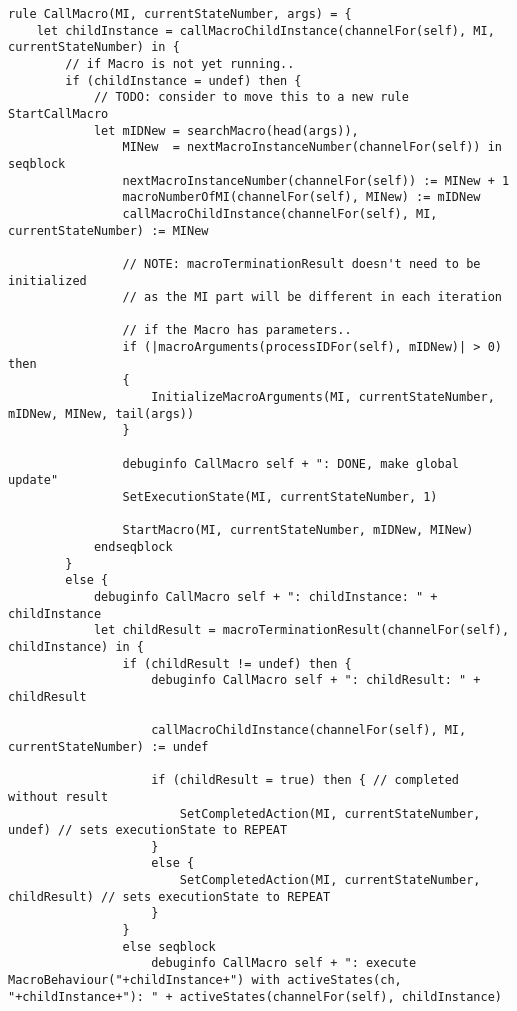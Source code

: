 \begin{listing}[H]
\begin{verbatim}
rule CallMacro(MI, currentStateNumber, args) = {
    let childInstance = callMacroChildInstance(channelFor(self), MI, currentStateNumber) in {
        // if Macro is not yet running..
        if (childInstance = undef) then {
            // TODO: consider to move this to a new rule StartCallMacro
            let mIDNew = searchMacro(head(args)),
                MINew  = nextMacroInstanceNumber(channelFor(self)) in seqblock
                nextMacroInstanceNumber(channelFor(self)) := MINew + 1
                macroNumberOfMI(channelFor(self), MINew) := mIDNew
                callMacroChildInstance(channelFor(self), MI, currentStateNumber) := MINew

                // NOTE: macroTerminationResult doesn't need to be initialized
                // as the MI part will be different in each iteration

                // if the Macro has parameters..
                if (|macroArguments(processIDFor(self), mIDNew)| > 0) then
                {
                    InitializeMacroArguments(MI, currentStateNumber, mIDNew, MINew, tail(args))
                }

                debuginfo CallMacro self + ": DONE, make global update"
                SetExecutionState(MI, currentStateNumber, 1)

                StartMacro(MI, currentStateNumber, mIDNew, MINew)
            endseqblock
        }
        else {
            debuginfo CallMacro self + ": childInstance: " + childInstance
            let childResult = macroTerminationResult(channelFor(self), childInstance) in {
                if (childResult != undef) then {
                    debuginfo CallMacro self + ": childResult: " + childResult

                    callMacroChildInstance(channelFor(self), MI, currentStateNumber) := undef

                    if (childResult = true) then { // completed without result
                        SetCompletedAction(MI, currentStateNumber, undef) // sets executionState to REPEAT
                    }
                    else {
                        SetCompletedAction(MI, currentStateNumber, childResult) // sets executionState to REPEAT
                    }
                }
                else seqblock
                    debuginfo CallMacro self + ": execute MacroBehaviour("+childInstance+") with activeStates(ch, "+childInstance+"): " + activeStates(channelFor(self), childInstance)


\end{verbatim}
\end{listing}
